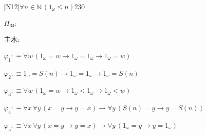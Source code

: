 \begin{fullproof}{[N12]}{$\forall n \in \mathbb{N}\,(1_{\omega} \leq n)$}{230}
\begin{ptree}
\end{ptree}
\noindent$\Pi_{34}$:
\begin{ptree}
\noLine
{}
\end{ptree}
\noindent 主木:
\begin{ptree}
\noLine
{}
\noLine
{}
\end{ptree}
\begin{abbrevlist}
\item $\varphi_{1} :\equiv \forall w\,(1_{\omega} = w \to 1_{\omega} = 1_{\omega} \to 1_{\omega} = w)$
\item $\varphi_{2} :\equiv 1_{\omega} = S(n) \to 1_{\omega} = 1_{\omega} \to 1_{\omega} = S(n)$
\item $\varphi_{3} :\equiv \forall w\,(1_{\omega} = w \to 1_{\omega} < 1_{\omega} \to 1_{\omega} < w)$
\item $\varphi_{4} :\equiv \forall x\,\forall y\,(x = y \to y = x) \to \forall y\,(S(n) = y \to y = S(n))$
\item $\varphi_{5} :\equiv \forall x\,\forall y\,(x = y \to y = x) \to \forall y\,(1_{\omega} = y \to y = 1_{\omega})$

\end{abbrevlist}
\end{fullproof}
